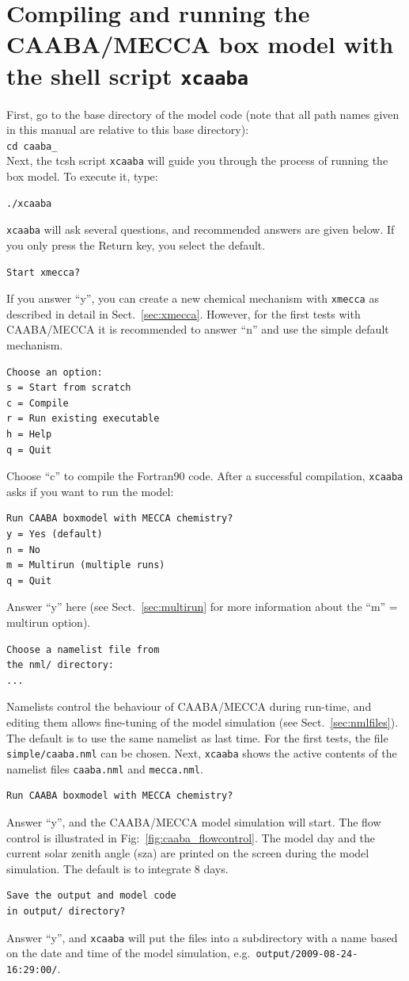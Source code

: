 \documentclass[twoside]{article}
\begin{document}
\section{Compiling and running the CAABA/MECCA box model with the shell
  script {\tt xcaaba}}
\label{sec:execute}

First, go to the base directory of the model code (note that all path
names given in this manual are relative to this base directory):\\[2mm]
{\tt cd caaba\_\meccaversion}\\[2mm]
Next, the tcsh script \verb|xcaaba| will guide you through the process
of running the box model. To execute it, type:
\begin{verbatim}
./xcaaba
\end{verbatim}
\verb|xcaaba| will ask several questions, and recommended answers are
given below. If you only press the Return key, you select the default.
\begin{verbatim}
Start xmecca?
\end{verbatim}
If you answer ``y'', you can create a new chemical mechanism with
\verb|xmecca| as described in detail in Sect.~\ref{sec:xmecca}. However,
for the first tests with CAABA/MECCA it is recommended to answer ``n''
and use the simple default mechanism.
\begin{verbatim}
Choose an option:
s = Start from scratch
c = Compile
r = Run existing executable
h = Help
q = Quit
\end{verbatim}
Choose ``c'' to compile the Fortran90 code. After a successful
compilation, \verb|xcaaba| asks if you want to run the model:
\begin{verbatim}
Run CAABA boxmodel with MECCA chemistry?
y = Yes (default)
n = No
m = Multirun (multiple runs)
q = Quit
\end{verbatim}
Answer ``y'' here (see Sect.~\ref{sec:multirun} for more information
about the ``m'' = multirun option).
\begin{verbatim}
Choose a namelist file from
the nml/ directory:
...
\end{verbatim}
Namelists control the behaviour of CAABA/MECCA during run-time, and
editing them allows fine-tuning of the model simulation (see
Sect.~\ref{sec:nmlfiles}). The default is to use the same namelist as
last time. For the first tests, the file \verb|simple/caaba.nml| can be
chosen. Next, \verb|xcaaba| shows the active contents of the namelist
files \verb|caaba.nml| and \verb|mecca.nml|.
\begin{verbatim}
Run CAABA boxmodel with MECCA chemistry?
\end{verbatim}
Answer ``y'', and the CAABA/MECCA model simulation will start. The flow
control is illustrated in Fig:~\ref{fig:caaba_flowcontrol}. The model
day and the current solar zenith angle (sza) are printed on the screen
during the model simulation. The default is to integrate 8 days.
\begin{verbatim}
Save the output and model code 
in output/ directory?
\end{verbatim}
Answer ``y'', and \verb|xcaaba| will put the files into a subdirectory
with a name based on the date and time of the model simulation, e.g.\
\verb|output/2009-08-24-16:29:00/|.
\end{document}
